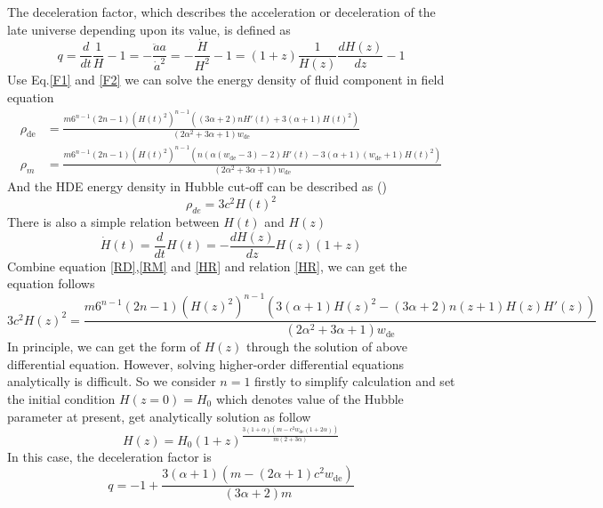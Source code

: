 \documentclass[manuscript]{aastex631}
\begin{document}
The deceleration factor, which describes the acceleration or deceleration of the late universe depending upon its value, is defined as
\begin{equation}
    q=\frac{d}{dt}\frac{1}{H}-1=-\frac{\ddot{a}a}{\dot{a}^2}=-\frac{\dot{H}}{H^2}-1=(1+z)\frac{1}{H(z)}\frac{dH(z)}{dz}-1   
\end{equation}
Use Eq.\eqref{F1} and \eqref{F2} we can solve the energy density of fluid component in field equation
\begin{align}
    \rho_\text{de}&= \frac{m 6^{n-1} (2 n-1) \left(H(t)^2\right)^{n-1} \left((3 \alpha +2) n H'(t)+3 (\alpha +1) H(t)^2\right)}{\left(2 \alpha ^2+3 \alpha +1\right) w_\text{de}} \label{RD}\\
    \rho_m&= \frac{m 6^{n-1} (2 n-1) \left(H(t)^2\right)^{n-1} \left(n (\alpha  (w_\text{de}-3)-2) H'(t)-3 (\alpha +1) (w_\text{de}+1) H(t)^2\right)}{\left(2 \alpha ^2+3 \alpha +1\right) w_\text{de}}\label{RM}
\end{align}
And the HDE energy density in Hubble cut-off can be described as (\cite{LI20041})
\begin{equation}
    \rho_{de}=3c^2 H(t)^2 \label{HDE}
\end{equation}
There is also a simple relation between $H(t)$ and $H(z)$
\begin{equation}
    \dot{H}(t)=\frac{d}{dt}H(t)=-\frac{d H(z)}{dz}H(z)(1+z)\label{HR}
\end{equation}
Combine equation \eqref{RD},\eqref{RM} and \eqref{HR} and relation \eqref{HR}, we can get the equation follows
\begin{equation}
    3 c^2 H(z)^2=\frac{m 6^{n-1} (2 n-1) \left(H(z)^2\right)^{n-1} \left(3 (\alpha +1) H(z)^2-(3 \alpha +2) n (z+1) H(z) H'(z)\right)}{\left(2 \alpha ^2+3 \alpha +1\right) {w_\text{de}}}
\end{equation}
In principle, we can get the form of $H(z)$ through the solution of above differential equation. However, solving higher-order differential equations analytically is difficult. So we consider $n=1$ firstly to simplify calculation and set the initial condition $H(z=0)=H_0$ which denotes value of the Hubble parameter at present, get analytically solution as follow
\begin{equation}
    H(z)= H_0 (1+z)^{\frac{3 (1+\alpha) \left(m-c^2 w_\text{de}(1+2\alpha)\right)}{m(2+3\alpha)}}
\end{equation}
In this case, the deceleration factor is
\begin{equation}
    q = -1+\frac{3 (\alpha +1) \left(m-(2 \alpha +1) c^2 w_\text{de}\right)}{(3 \alpha +2) m}
\end{equation}
\end{document}

